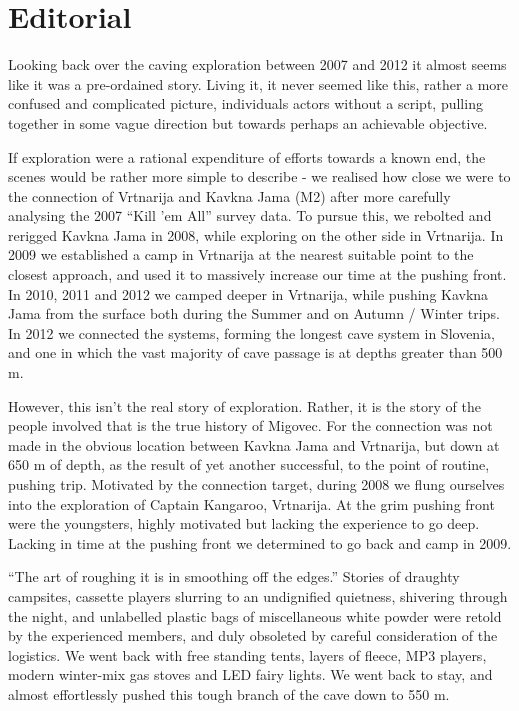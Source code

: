 \chapter*{Editorial}

Looking back over the caving exploration between 2007 and 2012 it almost
seems like it was a pre-ordained story. Living it, it never seemed like
this, rather a more confused and complicated picture, individuals actors
without a script, pulling together in some vague direction but towards
perhaps an achievable objective.

If exploration were a rational expenditure of efforts towards a known
end, the scenes would be rather more simple to describe - we realised
how close we were to the connection of Vrtnarija and Kavkna Jama (M2)
after more carefully analysing the 2007 ``Kill 'em All'' survey data. To
pursue this, we rebolted and rerigged Kavkna Jama in 2008, while
exploring on the other side in Vrtnarija. In 2009 we established a camp
in Vrtnarija at the nearest suitable point to the closest approach, and
used it to massively increase our time at the pushing front. In 2010,
2011 and 2012 we camped deeper in Vrtnarija, while pushing Kavkna Jama
from the surface both during the Summer and on Autumn / Winter trips. In
2012 we connected the systems, forming the longest cave system in
Slovenia, and one in which the vast majority of cave passage is at
depths greater than 500 m.

However, this isn't the real story of exploration. Rather, it is the
story of the people involved that is the true history of Migovec. For
the connection was not made in the obvious location between Kavkna Jama
and Vrtnarija, but down at 650 m of depth, as the result of yet another
successful, to the point of routine, pushing trip. Motivated by the
connection target, during 2008 we flung ourselves into the exploration
of Captain Kangaroo, Vrtnarija. At the grim pushing front were the
youngsters, highly motivated but lacking the experience to go deep.
Lacking in time at the pushing front we determined to go back and camp
in 2009.

``The art of roughing it is in smoothing off the edges.'' Stories of
draughty campsites, cassette players slurring to an undignified
quietness, shivering through the night, and unlabelled plastic bags of
miscellaneous white powder were retold by the experienced members, and
duly obsoleted by careful consideration of the logistics. We went back
with free standing tents, layers of fleece, MP3 players, modern
winter-mix gas stoves and LED fairy lights. We went back to stay, and
almost effortlessly pushed this tough branch of the cave down to 550 m.

